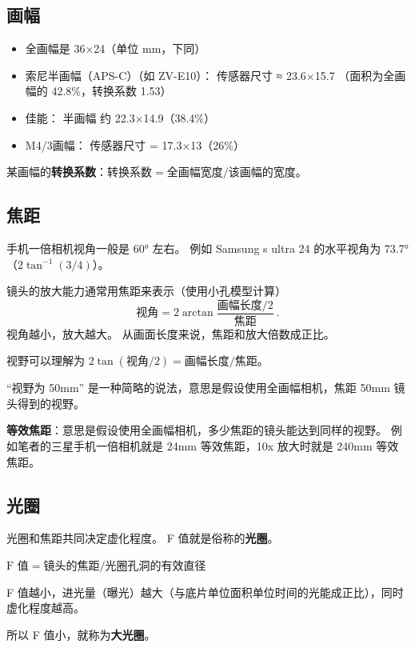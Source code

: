 
\subsection{画幅}
\begin{itemize}
\item 全画幅是 36×24（单位 mm，下同）
\item 索尼半画幅（APS-C）（如 ZV-E10）： 传感器尺寸 ≈ 23.6×15.7 （面积为全画幅的 42.8\%，转换系数 1.53）
\item 佳能： 半画幅 约 22.3×14.9（38.4\%）
\item M4/3画幅： 传感器尺寸 = 17.3×13（26\%）
\end{itemize}

某画幅的\textbf{转换系数}：$\text{转换系数} = \text{全画幅宽度}/\text{该画幅的宽度}$。

\subsection{焦距}
手机一倍相机视角一般是 60° 左右。 例如 Samsung s ultra 24 的水平视角为 73.7°（$2\tan^{-1}(3/4)$）。

镜头的放大能力通常用焦距来表示（使用小孔模型计算）
\begin{equation}
\text{视角} = 2\arctan{\frac{\text{画幅长度/2}}{\text{焦距}}}~.
\end{equation}
视角越小，放大越大。 从画面长度来说，焦距和放大倍数成正比。

视野可以理解为 $2\tan(\text{视角}/2) = \text{画幅长度}/{\text{焦距}}$。

“视野为 50mm” 是一种简略的说法，意思是假设使用全画幅相机，焦距 50mm 镜头得到的视野。

\textbf{等效焦距}：意思是假设使用全画幅相机，多少焦距的镜头能达到同样的视野。 例如笔者的三星手机一倍相机就是 24mm 等效焦距，10x 放大时就是 240mm 等效焦距。


\subsection{光圈}
光圈和焦距共同决定虚化程度。 F 值就是俗称的\textbf{光圈}。

$\text{F 值} = \text{镜头的焦距}/\text{光圈孔洞的有效直径}$

F 值越小，进光量（曝光）越大（与底片单位面积单位时间的光能成正比），同时虚化程度越高。

所以 F 值小，就称为\textbf{大光圈}。

